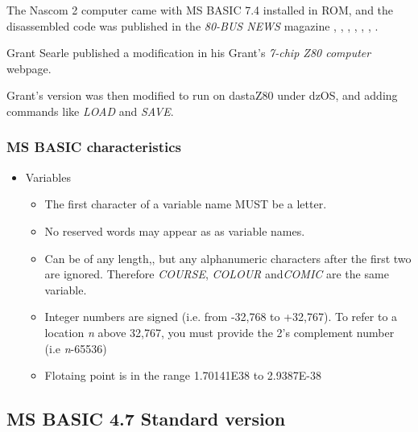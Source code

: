 \documentclass[a4paper,11pt]{article}
\begin{document}
    The Nascom 2 computer came with MS BASIC 7.4 installed in ROM, and the
    disassembled code was published in the \textit{80-BUS NEWS} magazine
    \cite{80busnews23}, \cite{80busnews24}, \cite{80busnews25},
    \cite{80busnews26}, \cite{80busnews31}, \cite{80busnews32},
    \cite{80busnews33}.

    Grant Searle published a modification in his Grant's \textit{7-chip Z80
    computer} webpage\cite{searle2}.

    Grant's version was then modified to run on dastaZ80 under dzOS, and adding
    commands like \textit{LOAD} and \textit{SAVE}.

    \subsubsection{MS BASIC characteristics}

    \begin{itemize}
        \item Variables
        \begin{itemize}
            \item The first character of a variable name MUST be a letter.
            \item No reserved words may appear as as variable names.
            \item Can be of any length,, but any alphanumeric characters after
            the first two are ignored. Therefore \textit{COURSE},
            \textit{COLOUR} and\textit{COMIC} are the same variable.
            \item Integer numbers are signed (i.e. from -32,768 to +32,767). To
            refer to a location \textit{n} above 32,767, you must provide the
            2's complement number (i.e \textit{n}-65536)
            \item Flotaing point is in the range 1.70141E38 to 2.9387E-38
        \end{itemize}
    \end{itemize}

    \subsection{MS BASIC 4.7 Standard version}
\end{document}
